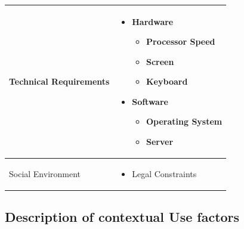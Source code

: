 \documentclass[15pt]{article}
\begin{document}
\begin{center}
\begin{longtable}{| p{} | p{} |}
Technical Requirements
 &  \begin{itemize}
  \item Hardware
    \begin{itemize}
        \item  Processor Speed
        \item Screen
        \item Keyboard
    \end{itemize}
  \item Software
    \begin{itemize}
        \item Operating System
        \item Server
    \end{itemize}
  \end{itemize}   \\
 \hline
 
 
 
Social Environment
 &  \begin{itemize}
  \item Legal Constraints
  \end{itemize}   \\
 [1ex] 
 \hline
\end{longtable}
\end{center}
\vspace{1cm}
\subsection{\Large{ Description of contextual Use factors}}
\end{document}
